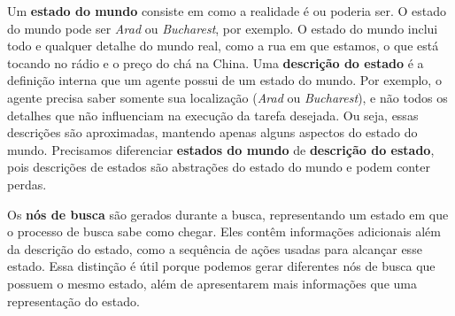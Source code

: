 \begin{solution}
Um \textbf{estado do mundo} consiste em como a realidade é ou poderia ser. O estado do mundo pode ser \textit{Arad} ou \textit{Bucharest}, por exemplo. O estado do mundo inclui todo e qualquer detalhe do mundo real, como a rua em que estamos, o que está tocando no rádio e o preço do chá na China. Uma \textbf{descrição do estado} é a definição interna que um agente possui de um estado do mundo. Por exemplo, o agente precisa saber somente sua localização (\textit{Arad} ou \textit{Bucharest}), e não todos os detalhes que não influenciam na execução da tarefa desejada. Ou seja, essas descrições são aproximadas, mantendo apenas alguns aspectos do estado do mundo.  Precisamos diferenciar \textbf{estados do mundo} de \textbf{descrição do estado}, pois descrições de estados são abstrações do estado do mundo e podem conter perdas.

Os \textbf{nós de busca} são gerados durante a busca, representando um estado em que o processo de busca sabe como chegar. Eles contêm informações adicionais além da descrição do estado, como a sequência de ações usadas para alcançar esse estado. Essa distinção é útil porque podemos gerar diferentes nós de busca que possuem o mesmo estado, além de apresentarem mais informações que uma representação do estado.
\end{solution}


